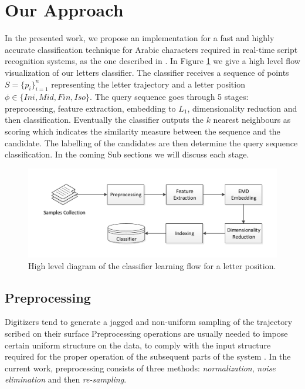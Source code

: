 \documentclass[10pt, conference, compsocconf]{IEEEtran}
\begin{document}
\section{Our Approach}
\label{sec:approach}
In the presented work, we propose an implementation for a fast and highly accurate classification technique for Arabic characters required in real-time script recognition systems, as the one described in \cite{kour2014real}.
In Figure \ref{fig:letters_classifier_learning_flow} we give a high level flow visualization of our letters classifier.
The classifier receives a sequence of points $S=\{p_{i}\}_{i=1}^{n}$ representing the letter trajectory and a letter position $\phi \in \{Ini, Mid, Fin, Iso\}$.
The query sequence goes through  5 stages: preprocessing, feature extraction, embedding to $L_1$, dimensionality reduction and then classification. 
Eventually the classifier outputs the $k$ nearest neighbours as scoring which indicates the similarity measure between the sequence and the candidate. 
The labelling of the candidates are then determine the query sequence classification.
In the coming Sub sections we will discuss each stage.


\begin{figure}
\centering
\includegraphics[width=1\columnwidth]{./figures/letters_classifier_learning_flow}       
\caption{High level diagram of the classifier learning flow for a letter position.}
\label{fig:letters_classifier_learning_flow}
\end{figure}
 
\subsection{Preprocessing}
Digitizers tend to generate a jagged and non-uniform sampling of the trajectory scribed on their surface
Preprocessing operations are usually needed to impose certain uniform structure on the data, to comply with the input structure required for the proper operation of the subsequent parts of the system \cite{al2011online}. 
In the current work, preprocessing consists of three methods: \emph{normalization}, \emph{noise elimination} and then \emph{re-sampling}.
\end{document}
